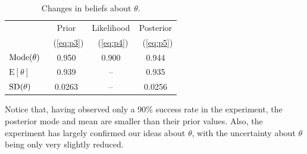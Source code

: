 {\begin{figure}[h!]
\end{figure}
\begin{table}[h!]
\bigskip

\begin{tabular}{|l|c|c|c|}
\cline{2-4}
\multicolumn{1}{c|}{~}& Prior & Likelihood & Posterior \\
\multicolumn{1}{c|}{~}&~(\ref{eq:p3})  &~(\ref{eq:p4}) & ~(\ref{eq:p5}) \\
\hline
$\textnormal{Mode}(\theta)$ & 0.950 & 0.900 & 0.944 \\
$\text{E}[\theta]$ & 0.939 & -- & 0.935 \\
$\textnormal{SD}(\theta)$ & 0.0263 & -- & 0.0256 \\
\hline
\end{tabular}
\caption{Changes in beliefs about $\theta$.}
\label{tab:betaplot4}

\end{table}

Notice that, having observed only a 90\% success rate in the experiment, the posterior mode and mean are smaller than their prior values. Also, the experiment has largely confirmed our ideas about $\theta$, with the uncertainty about $\theta$ being only very slightly reduced.}



